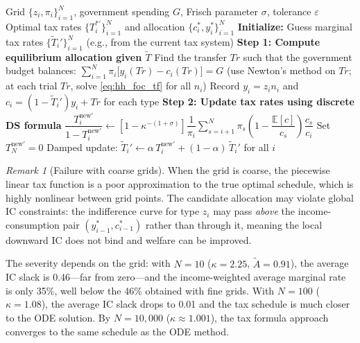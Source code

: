 \documentclass[12pt,a4paper]{article}
\theoremstyle{definition}
\theoremstyle{plain}
\theoremstyle{remark}
\newtheorem{remark}{Remark}[section]
\newcommand{\E}{\mathbb{E}}
\begin{document}
\begin{algorithm}[H]
\caption{Tax Formula Approach}\label{alg:tax_formula}
\begin{algorithmic}[1]
\Require Grid $\{z_i, \pi_i\}_{i=1}^{N}$, government spending $G$, Frisch parameter $\sigma$, tolerance $\varepsilon$
\Ensure Optimal tax rates $\{T_i^{*\prime}\}_{i=1}^{N}$ and allocation $\{c_i^*, y_i^*\}_{i=1}^{N}$
\Statex
\State \textbf{Initialize:} Guess marginal tax rates $\{\tilde{T}_i'\}_{i=1}^{N}$ (e.g., from the current tax system)
\Statex
\Repeat
  \State \textbf{Step 1: Compute equilibrium allocation given $\tilde{T}$}
  \State Find the transfer $\mathit{Tr}$ such that the government budget balances:
  \Statex \hspace{\algorithmicindent}\hspace{\algorithmicindent} $\sum_{i=1}^{N}\pi_i\bigl[y_i(\mathit{Tr}) - c_i(\mathit{Tr})\bigr] = G$
  \Statex \hspace{\algorithmicindent} (use Newton's method on $\mathit{Tr}$; at each trial $\mathit{Tr}$, solve \eqref{eq:hh_foc_tf} for all $n_i$)
  \State Record $y_i = z_i n_i$ and $c_i = (1-\tilde{T}_i')y_i + \mathit{Tr}$ for each type
  \Statex
  \State \textbf{Step 2: Update tax rates using discrete DS formula}
    \State $\dfrac{T_i^{\text{new}\prime}}{1 - T_i^{\text{new}\prime}} \gets \left[1 - \kappa^{-(1+\sigma)}\right] \dfrac{1}{\pi_i} \displaystyle\sum_{s=i+1}^{N} \pi_s \left(1 - \dfrac{\E[c]}{c_s}\right)\dfrac{c_s}{c_i}$
  \EndFor
  \State Set $T_N^{\text{new}\prime} = 0$ 
  \State Damped update: $\tilde{T}_i' \gets \alpha\, T_i^{\text{new}\prime} + (1-\alpha)\,\tilde{T}_i'$ for all $i$ 
\end{algorithmic}
\end{algorithm}

\begin{remark}[Failure with coarse grids]
When the grid is coarse, the piecewise linear tax function is a poor approximation to the true optimal schedule, which is highly nonlinear between grid points. The candidate allocation may violate global IC constraints: the indifference curve for type $z_i$ may pass \emph{above} the income-consumption pair $(y_{i-1}^*, c_{i-1}^*)$ rather than through it, meaning the local downward IC does not bind and welfare can be improved.

The severity depends on the grid: with $N = 10$ ($\kappa = 2.25$, $\tilde{A} = 0.91$), the average IC slack is 0.46---far from zero---and the income-weighted average marginal rate is only 35\%, well below the 46\% obtained with fine grids. With $N = 100$ ($\kappa = 1.08$), the average IC slack drops to 0.01 and the tax schedule is much closer to the ODE solution. By $N = 10{,}000$ ($\kappa \approx 1.001$), the tax formula approach converges to the same schedule as the ODE method.
\end{remark}
\end{document}
